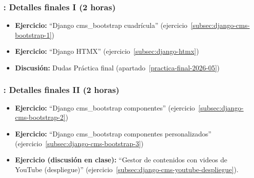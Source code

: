 \documentclass[a4paper,12pt]{article}
\begin{document}
 \subsubsection{\juevesN: Detalles finales I  (2 horas)}
 \label{cal:juevesN}

 \begin{itemize}
   \item \textbf{Ejercicio:} ``Django cms\_bootstrap cuadrícula'' (ejercicio~\ref{subsec:django-cms-bootstrap-1})
   \item \textbf{Ejercicio:} ``Django HTMX'' (ejercicio~\ref{subsec:django-htmx})
   \item \textbf{Discusión:} Dudas Práctica final (apartado~\ref{practica-final-2026-05})
\end{itemize}

\subsubsection{\lunesM: Detalles finales II (2 horas)}
\label{cal:lunesM}

\begin{itemize}
   \item \textbf{Ejercicio:} ``Django cms\_bootstrap componentes'' (ejercicio~\ref{subsec:django-cms-bootstrap-2})
\item \textbf{Ejercicio:} ``Django cms\_bootstrap componentes personalizados'' (ejercicio~\ref{subsec:django-cms-bootstrap-3})
\item \textbf{Ejercicio (discusión en clase):} ``Gestor de contenidos con videos de YouTube (despliegue)'' (ejercicio~\ref{subsec:django-cms-youtube-despliegue}).
\end{itemize}


\end{document}
